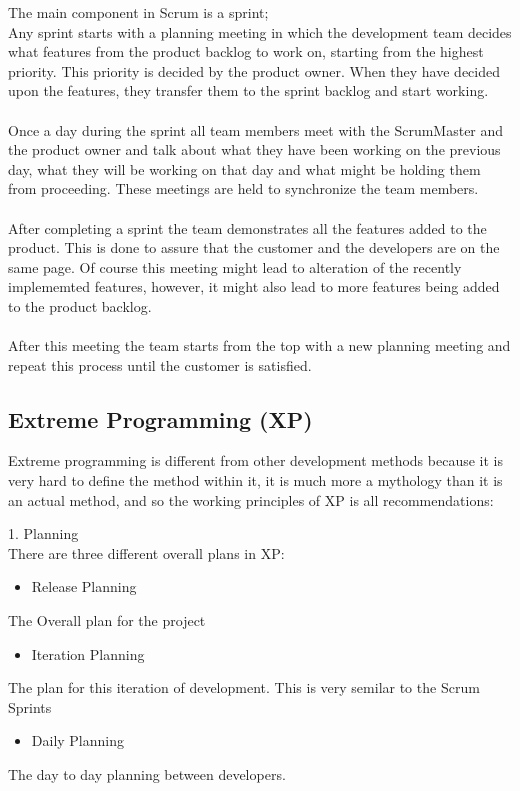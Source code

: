 The main component in Scrum is a sprint; \\
Any sprint starts with a planning meeting in which the development team decides what features from the product backlog to work on, starting from the highest priority. This priority is decided by the product owner. When they have decided upon the features, they transfer them to the sprint backlog and start working. \\
\\
Once a day during the sprint all team members meet with the ScrumMaster and the product owner and talk about what they have been working on the previous day, what they will be working on that day and what might be holding them from proceeding. These meetings are held to synchronize the team members.\\
\\
After completing a sprint the team demonstrates all the features added to the product. This is done to assure that the customer and the developers are on the same page. Of course this meeting might lead to alteration of the recently implememted features, however, it might also lead to more features being added to the product backlog.\\
\\
After this meeting the team starts from the top with a new planning meeting and repeat this process until the customer is satisfied.

\subsection{Extreme Programming (XP)}
Extreme programming is different from other development methods because it is very hard to define the method within it, it is much more a mythology than it is an actual method, and so the working principles of XP is all recommendations:

1. Planning\\
There are three different overall plans in XP:

\begin{itemize}
	\item Release Planning
\end{itemize}
The Overall plan for the project
\begin{itemize}
	\item Iteration Planning
\end{itemize}
The plan for this iteration of development. This is very semilar to the Scrum Sprints
\begin{itemize}
	\item Daily Planning
\end{itemize}
The day to day planning between developers.
\\

